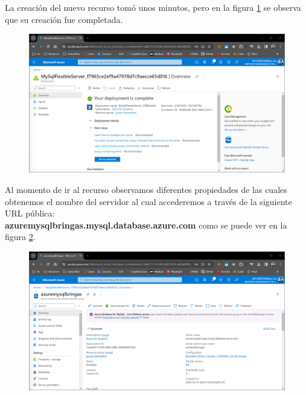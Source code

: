 \documentclass[12pt,a4paper]{article}
\begin{document}
La creación del nuevo recurso tomó unos minutos, pero en la figura \ref{fig:1_1_2_Azure_DBMS} se observa que su creación fue completada.

\begin{figure}[H]
    \centering
    \includegraphics[width=.85\linewidth]{M4_Servicios_Cómputo_en_la_Nube/Tarea_6_Creación_sistema_administración_Base_de_Datos/reporte/figuras/1_1_2_Azure_DBMS.png}
    \label{fig:1_1_2_Azure_DBMS}
\end{figure}

Al momento de ir al recurso observamos diferentes propiedades de las cuales obtenemos el nombre del servidor al cual accederemos a través de la siguiente URL pública:\\
\textbf{azuremysqlbringas.mysql.database.azure.com} como se puede ver en la figura \ref{fig:1_1_3_Azure_DBMS}.

\begin{figure}[H]
    \centering
    \includegraphics[width=.85\linewidth]{M4_Servicios_Cómputo_en_la_Nube/Tarea_6_Creación_sistema_administración_Base_de_Datos/reporte/figuras/1_1_3_Azure_DBMS.png}
    \label{fig:1_1_3_Azure_DBMS}
\end{figure}

\vspace{10em}
\end{document}
